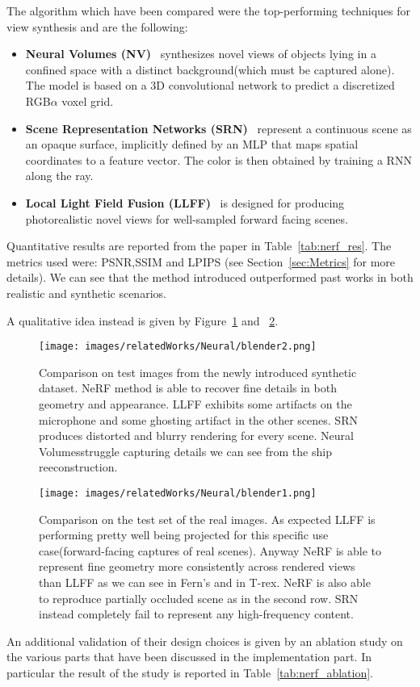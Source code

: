 The algorithm which have been compared were the top-performing techniques for view synthesis and 
are the following:
\begin{itemize}
    \item \textbf{Neural Volumes (NV)}~\cite{neuralvol} synthesizes novel views of objects
    lying in a confined space with a distinct background(which must be captured alone).
    The model is based on a 3D convolutional network to predict a discretized RGB$\alpha$ voxel grid.
    \item \textbf{Scene Representation Networks (SRN)}~\cite{srn} represent a continuous scene
    as an opaque surface, implicitly defined by an MLP that maps spatial coordinates to a
    feature vector. The color is then obtained by training a RNN along the ray.
    \item \textbf{Local Light Field Fusion (LLFF)}~\cite{LLFF} is designed for producing photorealistic
    novel views for well-sampled forward facing scenes.
\end{itemize}
Quantitative results are reported from the paper in Table~\ref{tab:nerf_res}.
The metrics used were: PSNR,SSIM and LPIPS (see Section~\ref{sec:Metrics} for more details).
We can see that the method introduced outperformed past works in both realistic and 
synthetic scenarios.



A qualitative idea instead is given by Figure~\ref{fig:blender2} and ~\ref{fig:blender1}.
\begin{figure}
    \centering
    \texttt{[image: images/relatedWorks/Neural/blender2.png]} 
    \caption{Comparison on test images from the newly introduced
    synthetic dataset. NeRF method is able to recover fine details in both geometry
    and appearance. LLFF exhibits some artifacts on the microphone and some ghosting
    artifact in the other scenes. SRN produces distorted and blurry rendering for every
    scene. Neural Volumesstruggle capturing details we can see from
    the ship reeconstruction.}\label{fig:blender2}
\end{figure}

\begin{figure}
    \centering
    \texttt{[image: images/relatedWorks/Neural/blender1.png]} 
    \caption{Comparison on the test set of the real images.
    As expected LLFF is performing pretty well being projected
    for this specific use case(forward-facing captures of real scenes).
    Anyway NeRF is able to represent fine geometry more consistently across
    rendered views than LLFF as we can see in Fern's and in T-rex. NeRF
    is also able to reproduce partially occluded scene as in the second row.
    SRN instead completely fail to represent any high-frequency content.}\label{fig:blender1}
\end{figure}
An additional validation of their design choices is given by an ablation
study on the various parts that have been discussed in the implementation part.
In particular the result of the study is reported in Table~\ref{tab:nerf_ablation}.


